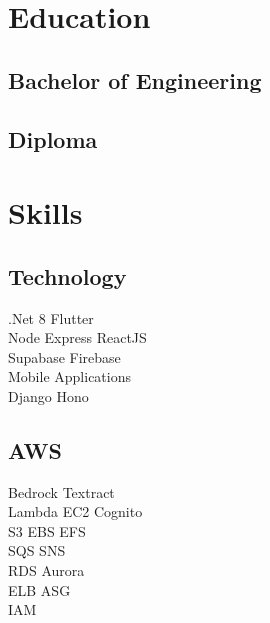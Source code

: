 \documentclass[]{deedy-resume-reversed}
\begin{document}
\hfill
\begin{minipage}[t]{0.33\textwidth}


\section{Education}

\subsection{Bachelor of Engineering}
\sectionsep

\subsection{Diploma}
\sectionsep


\section{Skills}

\subsection{Technology}
.Net 8 \textbullet Flutter \\
Node  \textbullet Express \textbullet ReactJS \textbullet \\ 
Supabase \textbullet Firebase  \\
Mobile Applications \\
Django \textbullet Hono \textbullet
\sectionsep

\subsection{AWS}
Bedrock \textbullet Textract \\
Lambda \textbullet EC2 \textbullet Cognito \\
S3 \textbullet EBS \textbullet EFS\\
SQS \textbullet SNS \\
RDS \textbullet Aurora \\
ELB \textbullet ASG \\
IAM \\
\sectionsep


\end{minipage}
\end{document}
